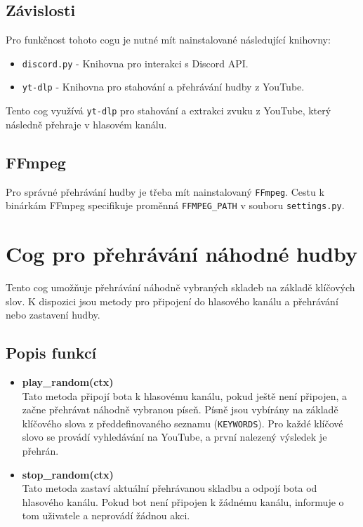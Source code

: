 \documentclass[12pt, a4paper]{report}
\begin{document}
\subsection{Závislosti}
Pro funkčnost tohoto cogu je nutné mít nainstalované následující knihovny:
\begin{itemize}
    \item \texttt{discord.py} - Knihovna pro interakci s Discord API.
    \item \texttt{yt-dlp} - Knihovna pro stahování a přehrávání hudby z YouTube.
\end{itemize}

Tento cog využívá \texttt{yt-dlp} pro stahování a extrakci zvuku z YouTube, který následně přehraje v hlasovém kanálu.

\subsection{FFmpeg}
Pro správné přehrávání hudby je třeba mít nainstalovaný \texttt{FFmpeg}. Cestu k binárkám FFmpeg specifikuje proměnná \texttt{FFMPEG\_PATH} v souboru \texttt{settings.py}.

\section{Cog pro přehrávání náhodné hudby}

Tento cog umožňuje přehrávání náhodně vybraných skladeb na základě klíčových slov. K dispozici jsou metody pro připojení do hlasového kanálu a přehrávání nebo zastavení hudby.

\subsection{Popis funkcí}

\begin{itemize}
    \item \textbf{play\_random(ctx)} \\
    Tato metoda připojí bota k hlasovému kanálu, pokud ještě není připojen, a začne přehrávat náhodně vybranou píseň. Písně jsou vybírány na základě klíčového slova z předdefinovaného seznamu (\texttt{KEYWORDS}). Pro každé klíčové slovo se provádí vyhledávání na YouTube, a první nalezený výsledek je přehrán.

    \item \textbf{stop\_random(ctx)} \\
    Tato metoda zastaví aktuální přehrávanou skladbu a odpojí bota od hlasového kanálu. Pokud bot není připojen k žádnému kanálu, informuje o tom uživatele a neprovádí žádnou akci.

\end{itemize}
\end{document}
